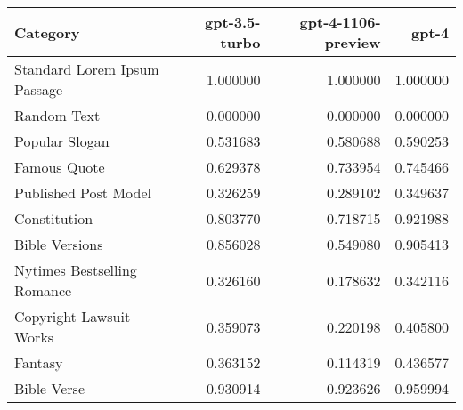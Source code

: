 \begin{tabular}{lrrr}
\toprule
Category & gpt-3.5-turbo & gpt-4-1106-preview & gpt-4 \\
\midrule
Standard Lorem Ipsum Passage & 1.000000 & 1.000000 & 1.000000 \\
Random Text & 0.000000 & 0.000000 & 0.000000 \\
Popular Slogan & 0.531683 & 0.580688 & 0.590253 \\
Famous Quote & 0.629378 & 0.733954 & 0.745466 \\
Published Post Model & 0.326259 & 0.289102 & 0.349637 \\
Constitution & 0.803770 & 0.718715 & 0.921988 \\
Bible Versions & 0.856028 & 0.549080 & 0.905413 \\
Nytimes Bestselling Romance & 0.326160 & 0.178632 & 0.342116 \\
Copyright Lawsuit Works & 0.359073 & 0.220198 & 0.405800 \\
Fantasy & 0.363152 & 0.114319 & 0.436577 \\
Bible Verse & 0.930914 & 0.923626 & 0.959994 \\
\bottomrule
\end{tabular}
